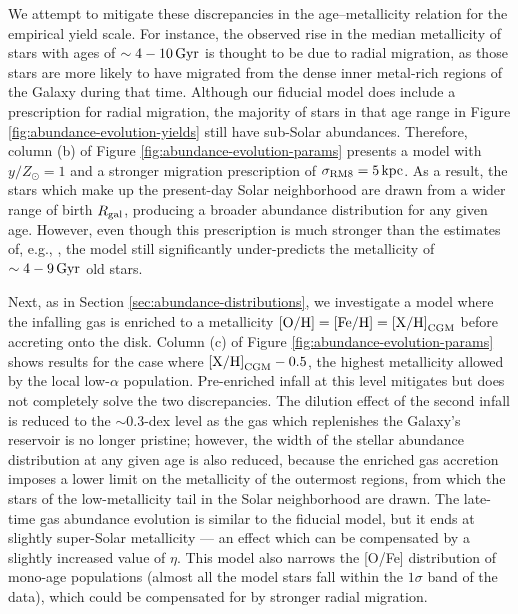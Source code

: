 \documentclass[twocolumn,twocolappendix,linenumbers]{aastex631}
\newcommand{\mathOH}{{\rm [O/H]}}
\newcommand{\mathFeH}{{\rm [Fe/H]}}
\newcommand{\yZ}[1]{$y/Z_\odot=#1$}
\begin{document}
We attempt to mitigate these discrepancies in the age--metallicity relation for the empirical yield scale. 
For instance, the observed rise in the median metallicity of stars with ages of $\sim4-10\,{\rm Gyr}$ is thought to be due to radial migration, as those stars are more likely to have migrated from the dense inner metal-rich regions of the Galaxy during that time. Although our fiducial model does include a prescription for radial migration, the majority of stars in that age range in Figure \ref{fig:abundance-evolution-yields} still have sub-Solar abundances. Therefore, column (b) of Figure \ref{fig:abundance-evolution-params} presents a model with $y/Z_\odot=1$ and a stronger migration prescription of $\sigma_{\rm RM8}=5\,{\rm kpc}$. As a result, the stars which make up the present-day Solar neighborhood are drawn from a wider range of birth $R_{\rm gal}$, producing a broader abundance distribution for any given age. However, even though this prescription is much stronger than the estimates of, e.g., \citet{frankel_measuring_2018}, the model still significantly under-predicts the metallicity of $\sim4-9\,{\rm Gyr}$ old stars.

Next, as in Section \ref{sec:abundance-distributions}, we investigate a model where the infalling gas is enriched to a metallicity $\mathOH=\mathFeH={\rm [X/H]}_{\rm CGM}$ before accreting onto the disk. Column (c) of Figure \ref{fig:abundance-evolution-params} shows results for the case where ${\rm [X/H]}_{\rm CGM}-0.5$, the highest metallicity allowed by the local low-$\alpha$ population. Pre-enriched infall at this level mitigates but does not completely solve the two discrepancies. The dilution effect of the second infall is reduced to the $\sim0.3$-dex level as the gas which replenishes the Galaxy's reservoir is no longer pristine; however, the width of the stellar abundance distribution at any given age is also reduced, because the enriched gas accretion imposes a lower limit on the metallicity of the outermost regions, from which the stars of the low-metallicity tail in the Solar neighborhood are drawn. The late-time gas abundance evolution is similar to the fiducial model, but it ends at slightly super-Solar metallicity --- an effect which can be compensated by a slightly increased value of $\eta$. This model also narrows the [O/Fe] distribution of mono-age populations (almost all the model stars fall within the $1\sigma$ band of the data), which could be compensated for by stronger radial migration.
\end{document}
